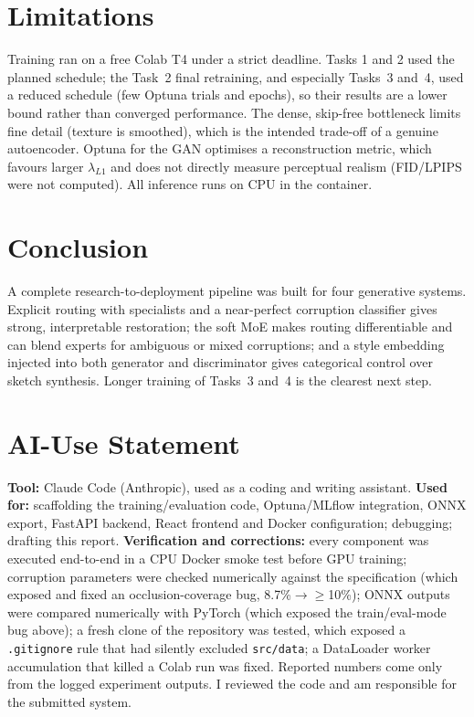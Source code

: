 \documentclass[conference]{IEEEtran}
\begin{document}
\section{Limitations}
Training ran on a free Colab T4 under a strict deadline. Tasks 1 and 2 used the planned schedule; the Task~2 final retraining, and especially Tasks~3 and~4, used a reduced schedule (few Optuna trials and epochs), so their results are a lower bound rather than converged performance. The dense, skip-free bottleneck limits fine detail (texture is smoothed), which is the intended trade-off of a genuine autoencoder. Optuna for the GAN optimises a reconstruction metric, which favours larger $\lambda_{L1}$ and does not directly measure perceptual realism (FID/LPIPS were not computed). All inference runs on CPU in the container.

\section{Conclusion}
A complete research-to-deployment pipeline was built for four generative systems. Explicit routing with specialists and a near-perfect corruption classifier gives strong, interpretable restoration; the soft MoE makes routing differentiable and can blend experts for ambiguous or mixed corruptions; and a style embedding injected into both generator and discriminator gives categorical control over sketch synthesis. Longer training of Tasks~3 and~4 is the clearest next step.

\appendices
\section{AI-Use Statement}
\textbf{Tool:} Claude Code (Anthropic), used as a coding and writing assistant.
\textbf{Used for:} scaffolding the training/evaluation code, Optuna/MLflow integration, ONNX export, FastAPI backend, React frontend and Docker configuration; debugging; drafting this report.
\textbf{Verification and corrections:} every component was executed end-to-end in a CPU Docker smoke test before GPU training; corruption parameters were checked numerically against the specification (which exposed and fixed an occlusion-coverage bug, 8.7\%$\rightarrow\geq$10\%); ONNX outputs were compared numerically with PyTorch (which exposed the train/eval-mode bug above); a fresh clone of the repository was tested, which exposed a \texttt{.gitignore} rule that had silently excluded \texttt{src/data}; a DataLoader worker accumulation that killed a Colab run was fixed. Reported numbers come only from the logged experiment outputs. I reviewed the code and am responsible for the submitted system.
\end{document}
